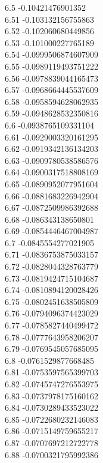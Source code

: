{6.5	-0.10421476901352\\
6.51	-0.103132156755863\\
6.52	-0.102060680449856\\
6.53	-0.101000227765189\\
6.54	-0.0999506874607909\\
6.55	-0.0989119493751222\\
6.56	-0.0978839044165473\\
6.57	-0.0968664445537609\\
6.58	-0.0958594628062935\\
6.59	-0.0948628532350816\\
6.6	-0.0938765109331104\\
6.61	-0.0929003320161295\\
6.62	-0.0919342136134203\\
6.63	-0.0909780538586576\\
6.64	-0.0900317518808169\\
6.65	-0.0890952077951604\\
6.66	-0.0881683226942904\\
6.67	-0.0872509986392688\\
6.68	-0.086343138650801\\
6.69	-0.0854446467004987\\
6.7	-0.0845554277021905\\
6.71	-0.0836753875033157\\
6.72	-0.0828044328763779\\
6.73	-0.0819424715104687\\
6.74	-0.0810894120028426\\
6.75	-0.0802451638505809\\
6.76	-0.0794096374423029\\
6.77	-0.0785827440499472\\
6.78	-0.0777643958206207\\
6.79	-0.0769545057685095\\
6.8	-0.0761529877668485\\
6.81	-0.0753597565399703\\
6.82	-0.0745747276553975\\
6.83	-0.0737978175160162\\
6.84	-0.0730289433523022\\
6.85	-0.0722680232146083\\
6.86	-0.0715149759655217\\
6.87	-0.0707697212722778\\
6.88	-0.0700321795992386\\
}
